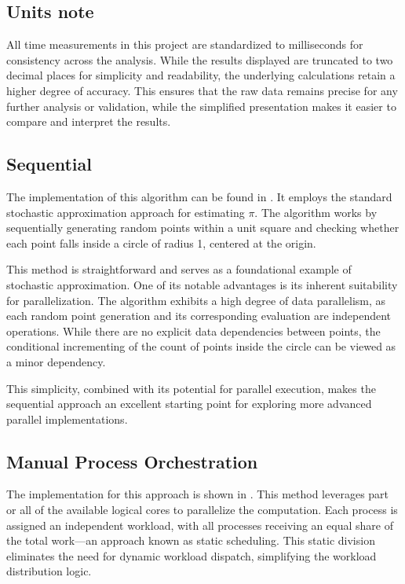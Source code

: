 \documentclass[a4paper, oneside]{article}
\begin{document}
\subsection{Units note}
All time measurements in this project are standardized to milliseconds for consistency across the analysis. While the results displayed are truncated to two decimal places for simplicity and readability, the underlying calculations retain a higher degree of accuracy. This ensures that the raw data remains precise for any further analysis or validation, while the simplified presentation makes it easier to compare and interpret the results.

\subsection{Sequential}
The implementation of this algorithm can be found in . It employs the standard stochastic approximation approach for estimating $\pi$. The algorithm works by sequentially generating random points within a unit square and checking whether each point falls inside a circle of radius 1, centered at the origin.

This method is straightforward and serves as a foundational example of stochastic approximation. One of its notable advantages is its inherent suitability for parallelization. The algorithm exhibits a high degree of data parallelism, as each random point generation and its corresponding evaluation are independent operations. While there are no explicit data dependencies between points, the conditional incrementing of the count of points inside the circle can be viewed as a minor dependency.

This simplicity, combined with its potential for parallel execution, makes the sequential approach an excellent starting point for exploring more advanced parallel implementations.

\subsection{Manual Process Orchestration}
The implementation for this approach is shown in . This method leverages part or all of the available logical cores to parallelize the computation. Each process is assigned an independent workload, with all processes receiving an equal share of the total work—an approach known as static scheduling. This static division eliminates the need for dynamic workload dispatch, simplifying the workload distribution logic.
\end{document}
